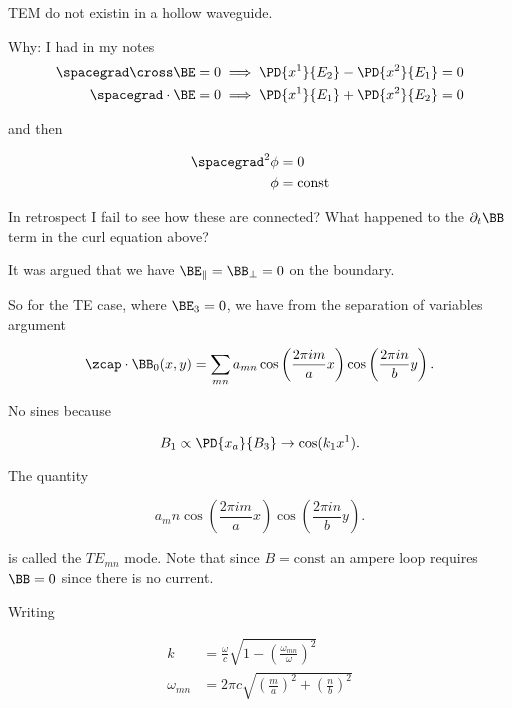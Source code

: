 \begin{claim}TEM do not existin in a hollow waveguide.
\end{claim}

Why: I had in my notes
\begin{align*}
\spacegrad \cross \BE = 0 & \implies \PD{x^1}{E_2} -\PD{x^2}{E_1} = 0 \\
\spacegrad \cdot \BE = 0 & \implies \PD{x^1}{E_1} +\PD{x^2}{E_2} = 0
\end{align*}

and then

\begin{align*}
\spacegrad^2 \phi &= 0 \\
\phi &= \text{const}
\end{align*}

In retrospect I fail to see how these are connected?  What happened to the $\partial_t \BB$ term in the curl equation above?

It was argued that we have $\BE_\parallel = \BB_\perp = 0$ on the boundary.

So for the TE case, where $\BE_3 = 0$, we have from the separation of variables argument

\begin{equation}\label{eqn:relativisticElectrodynamicsT4:440}
\zcap \cdot \BB_0(x, y) =
\sum_{mn} a_{mn} 
\cos\left( \frac{2 \pi i m}{a} x \right)
\cos\left( \frac{2 \pi i n}{b} y \right).
\end{equation}

No sines because 

\begin{equation}\label{eqn:relativisticElectrodynamicsT4:460}
B_1 \propto \PD{x_a}{B_3} \rightarrow \cos(k_1 x^1).
\end{equation}

The quantity

\begin{equation}\label{eqn:relativisticElectrodynamicsT4:480}
a_mn 
\cos\left( \frac{2 \pi i m}{a} x \right)
\cos\left( \frac{2 \pi i n}{b} y \right).
\end{equation}

is called the $TE_{mn}$ mode.  Note that since $B = \text{const}$ an ampere loop requires $\BB = 0$ since there is no current.

Writing 

\begin{align}\label{eqn:relativisticElectrodynamicsT4:500}
k &= \frac{\omega}{c} \sqrt{ 1 - \left(\frac{\omega_{mn}}{\omega}\right)^2 } \\
\omega_{mn} &= 2 \pi c \sqrt{ \left(\frac{m}{a} \right)^2 + \left(\frac{n}{b} \right)^2 }
\end{align}

